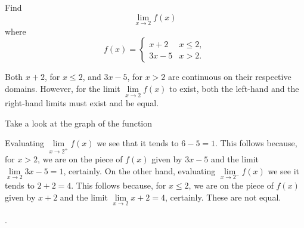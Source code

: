 \documentclass{ximera}
\begin{document}
\begin{question}
  Find 
  \[
  \displaystyle \lim_{x\to 2} f(x)
  \]
  where
  \[
  f(x) = \left\{\begin{array}{cl} x+2 & x\leq 2, \\ 3x-5 & x>2. \end{array}\right.
  \]
  \begin{solution}
    \begin{hint}
     Both $x+2$, for $x\le2$, and $3x-5$, for $x>2$ are continuous on their respective domains. However, for the limit $\lim\limits_{x\to2}f(x)$ to exist, both the left-hand and the right-hand limits must exist and be equal.
    \end{hint}
     \begin{hint}
    	Take a look at the graph of the function
    \begin{center}
      \end{center} 
    \end{hint}
    \begin{hint}
     Evaluating $\lim\limits_{x\to2^{+}}f(x)$ we see that it tends to $6-5=1$. This follows because, for $x>2$, we are on the piece of $f(x)$ given by $3x-5$ and the limit $\lim\limits_{x\to2}3x-5=1$, certainly. On the other hand, evaluating $\lim\limits_{x\to2^{-}}f(x)$ we see it tends to $2+2=4$. This follows because, for $x\le2$, we are on the piece of $f(x)$ given by $x+2$ and the limit $\lim\limits_{x\to2}x+2=4$, certainly. These are not equal.
    \end{hint} 
    .
  \end{solution}
\end{question}
\end{document}
